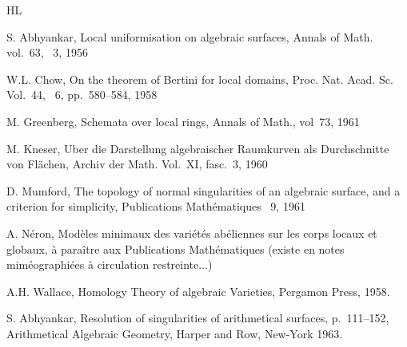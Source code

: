 \begin{thebibliography}{HL}\label{XIII.7}

S. Abhyankar, Local uniformisation on algebraic surfaces, Annals of Math. vol.~63, \No~3, 1956

W.L. Chow, On the theorem of Bertini for local domains, Proc. Nat. Acad. Sc. Vol.~44, \No~6, pp.\, 580--584, 1958

M. Greenberg, Schemata over local rings, Annals of Math., vol~73, 1961

M. Kneser, Uber die Darstellung algebraischer Raumkurven als Durchschnitte von Fl\"achen, Archiv der Math. Vol.~XI, fasc.~3, 1960

D. Mumford, The topology of normal singularities of an algebraic surface, and a criterion for simplicity, Publications Math\'ematiques \No~9, 1961

A. N\'eron, Mod\`eles minimaux des vari\'et\'es ab\'eliennes sur les corps locaux et globaux, \`a para\^itre aux Publications Math\'ematiques (existe en notes mim\'eographi\'ees \`a circulation restreinte...)

A.H. Wallace, Homology Theory of algebraic Varieties, Pergamon Press, 1958.

S. Abhyankar, Resolution of singularities of arithmetical surfaces, p.\, 111--152, Arithmetical Algebraic Geometry, Harper and Row, New-York 1963.


\end{thebibliography}

